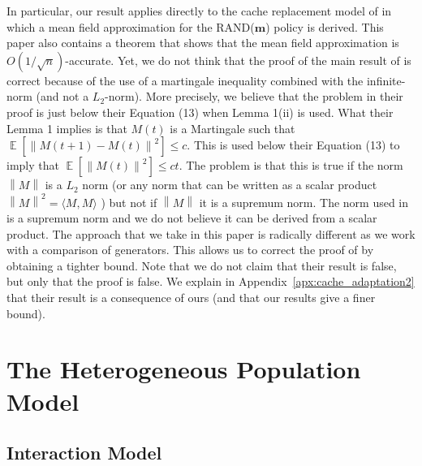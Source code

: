 \documentclass[acmsmall]{acmart}
\newcommand\bm{\mathbf{m}}
\DeclareMathOperator{\E}{\mathbb{E}} %
\newcommand\esp[1]{\E\left[#1\right]} %
\newcommand\norm[1]{\left\|#1\right\|}      %
\begin{document}
{\color{myorange}
In particular, our result applies directly to the cache replacement model of \cite{gastTransientSteadystateRegime2015} in which a mean field approximation for the RAND($\bm$) policy is derived. This paper also contains a theorem that shows that the mean field approximation is $O(1/\sqrt{n})$-accurate. Yet, we do not think that the proof of the main result of \cite{gastTransientSteadystateRegime2015} is correct because of the use of a martingale inequality combined with the infinite-norm (and not a $L_2$-norm). More precisely, we believe that the problem in their proof is just below their Equation (13) when Lemma 1(ii) is used.  What their Lemma 1 implies is that $M(t)$ is a Martingale such that $\esp{ \norm{M(t+1)-M(t)}^2} \le c$. This is used below their Equation (13) to imply that $\esp{\norm{M(t)}^2} \le ct$. The problem is that this is true if the norm $\norm{M}$ is a $L_2$ norm (or any norm that can be written as a scalar product $\norm{M}^2 =\langle M,M\rangle$ ) but not if $\norm{M}$ it is a supremum norm. The norm used in \cite{gastTransientSteadystateRegime2015} is a supremum norm and we do not believe it can be derived from a scalar product. The approach that we take in this paper is radically different as we work with a comparison of generators. This allows us to correct the proof of \cite{gastTransientSteadystateRegime2015} by obtaining a tighter bound. Note that we do not claim that their result is false, but only that the proof is false. We explain in Appendix~\ref{apx:cache_adaptation2} that their result is a consequence of ours (and that our results give a finer bound).
}


\section{The Heterogeneous Population Model}
\label{sec:model}

\subsection{Interaction Model}
\label{ssec:interaction_model_and_definition}
\end{document}
